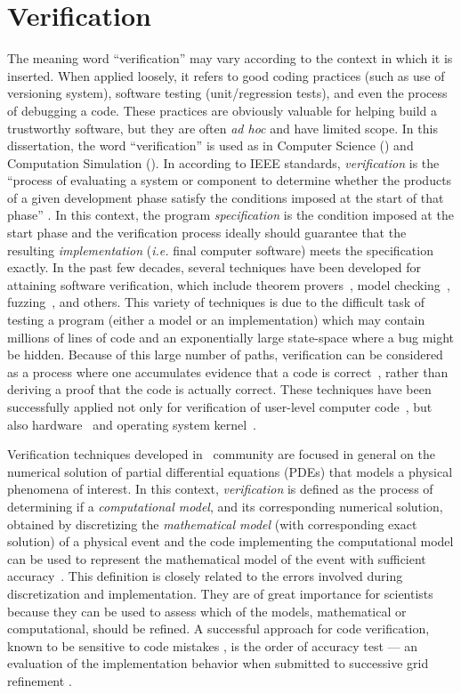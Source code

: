 \section{Verification}

The meaning word ``verification'' may vary according to the context in which it is inserted. When applied loosely, it refers to good coding practices
(such as use of versioning system), software testing (unit/regression tests), and even the process of debugging a code. These practices are obviously valuable for helping build a trustworthy software, but they are often \emph{ad hoc} and have limited scope. 
In this dissertation, the word ``verification'' is used as in Computer Science (\cs) and Computation Simulation (\cse). 
In \cs{} according to IEEE standards, 
\emph{verification} is the ``process of evaluating a 
system or component to determine whether the products of a given 
development phase satisfy the conditions imposed at the start of
that phase'' \cite{159342}.
%
In this context, the program \emph{specification} is the condition
imposed at the start phase and the verification process
ideally should guarantee that the resulting \emph{implementation}
({\em i.e.} final computer software) meets the 
specification exactly. 
%
In the past
few decades, several techniques have been developed
for attaining software verification, which include theorem
provers~\cite{Bowen95}, 
model checking~\cite{Clarke08},
fuzzing~\cite{bird83, godefroid08},  and others. This variety of
techniques is due to the difficult task of testing a program (either
a model or an implementation) which may contain millions of lines
of code and an exponentially large state-space where a
bug might be 
hidden. Because of this large number of paths,
verification can be considered as a
process where one accumulates evidence that a code is
correct~\cite{roach98}, rather than deriving a proof that the code is actually correct.
These techniques have been successfully applied not only for
verification of 
user-level computer code~\cite{1646374}, but also
hardware~\cite{seger92} and  
operating system kernel~\cite{1629596}. 

Verification techniques developed in \cse~community are focused in general on the
numerical solution of partial differential equations (PDEs) that 
models a physical phenomena of
interest. In this context, 
\emph{verification} is defined as the process of determining if a
\emph{computational model}, and its corresponding numerical solution, 
obtained by discretizing the \emph{mathematical model} (with corresponding
exact solution) of a physical event and the code
implementing the computational model  
can be used to represent the mathematical model of the event with 
sufficient accuracy~\cite{babuska04}.
%
This definition is closely related to the errors involved during
discretization and implementation. They are of great importance for
scientists because they can be used to assess which of the models,
mathematical or computational, should be refined.  A successful
approach for code verification, known to be sensitive to code
mistakes \cite{roach98}, is the order of accuracy test --- an
evaluation of the implementation behavior when submitted to successive
grid refinement \cite{roach98}. 


